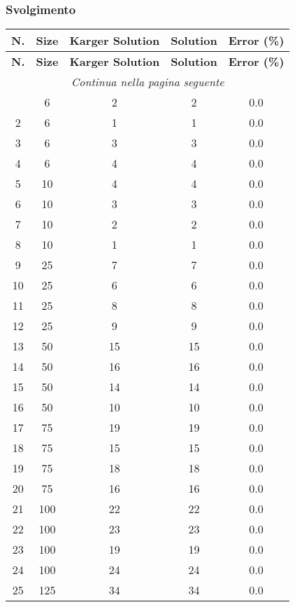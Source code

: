 \subsubsection{Svolgimento}

\begin{center}
	\begin{longtable}{|c|c|c|c|c|}	
		\hline
		\textbf{N.} & \textbf{Size} & \textbf{Karger Solution} & \textbf{Solution} & \textbf{Error (\%)}
		\endfirsthead
		\multicolumn{5}{|c|}{\tablename\ \thetable\ \ --\  \textit{continuazione dalla pagina precedente}} \\
		\hline
		\textbf{N.} & \textbf{Size} & \textbf{Karger Solution} & \textbf{Solution} & \textbf{Error (\%)} \\ \hline
		\endhead
		\hline \multicolumn{5}{|c|}{\textit{Continua nella pagina seguente}} \\
		\endfoot  
		\endlastfoot
		\hline
		1 & 6 & 2 & 2 & 0.0 \\
		2 & 6 & 1 & 1 & 0.0 \\
		3 & 6 & 3 & 3 & 0.0 \\
		4 & 6 & 4 & 4 & 0.0 \\
		5 & 10 & 4 & 4 & 0.0 \\
		6 & 10 & 3 & 3 & 0.0 \\
		7 & 10 & 2 & 2 & 0.0 \\
		8 & 10 & 1 & 1 & 0.0 \\
		9 & 25 & 7 & 7 & 0.0 \\
		10 & 25 & 6 & 6 & 0.0 \\
		11 & 25 & 8 & 8 & 0.0 \\
		12 & 25 & 9 & 9 & 0.0 \\
		13 & 50 & 15 & 15 & 0.0 \\
		14 & 50 & 16 & 16 & 0.0 \\
		15 & 50 & 14 & 14 & 0.0 \\
		16 & 50 & 10 & 10 & 0.0 \\
		17 & 75 & 19 & 19 & 0.0 \\
		18 & 75 & 15 & 15 & 0.0 \\
		19 & 75 & 18 & 18 & 0.0 \\
		20 & 75 & 16 & 16 & 0.0 \\
		21 & 100 & 22 & 22 & 0.0 \\
		22 & 100 & 23 & 23 & 0.0 \\
		23 & 100 & 19 & 19 & 0.0 \\
		24 & 100 & 24 & 24 & 0.0 \\
		25 & 125 & 34 & 34 & 0.0 \\

\end{longtable}
\end{center}
